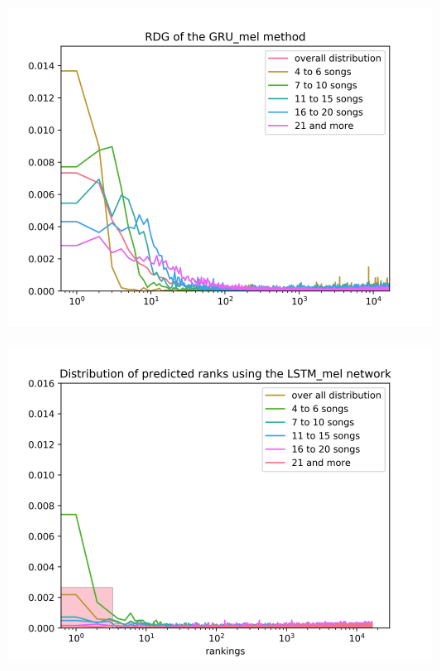 \begin{figure}[h]
\centering
\begin{minipage}{.5\textwidth}
  \centering
  \includegraphics[width=1\linewidth]{./img/gru_mel_graph.png}
  \label{fig:gru_mel_distribution}
\end{minipage}%
\begin{minipage}{.5\textwidth}
  \centering
  \includegraphics[width=1\linewidth]{./img/lstm_mel_graph.png}
  \label{fig:lstm_mel_distribution}
\end{minipage}
\end{figure}\label{fig:mel_nn_distributions}

